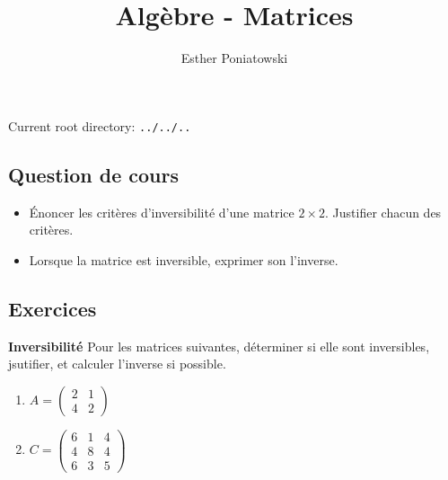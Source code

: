 \documentclass[10pt,a4paper]{article}
\title{Algèbre - Matrices}
\author{Esther Poniatowski}
\date{}
\providecommand{\rootpath}{../../..}
\begin{document}
\maketitle
Current root directory: \texttt{\rootpath}

\subsection*{Question de cours}
\begin{itemize}
    \item Énoncer les critères d'inversibilité d'une matrice $2 \times 2$. Justifier chacun des critères.
    \item Lorsque la matrice est inversible, exprimer son l'inverse.
\end{itemize}

\bigskip

\subsection*{Exercices}

\textbf{Inversibilité}
Pour les matrices suivantes, déterminer si elle sont inversibles, jsutifier, et calculer l'inverse
si possible.
\begin{enumerate}
    \item $A = \begin{pmatrix} 2 & 1 \\ 4 & 2 \end{pmatrix}$
    \item $C = \begin{pmatrix}
        6 & 1 & 4 \\
        4 & 8 & 4 \\
        6 & 3 & 5
        \end{pmatrix}$
\end{enumerate}

\bigskip
\end{document}
